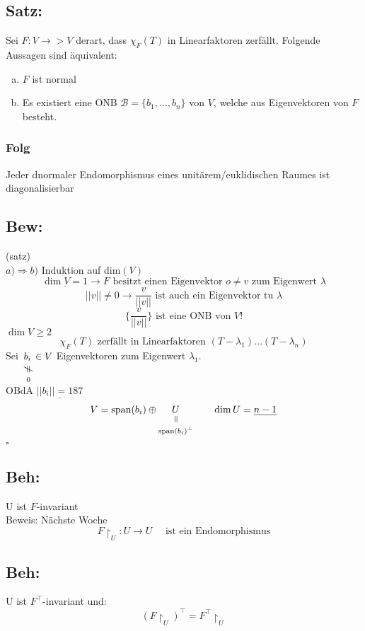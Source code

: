\documentclass[titlepage,12pt,a4paper,ngerman]{report}
\newenvironment{bew}{\subsection{Bew:}}{\hfill$\square$}
\newcommand{\Bew}[1]{\begin{bew}#1\end{bew}}
\newcommand{\verteq}{\rotatebox{90}{$\,=$}}
\newcommand{\equalto}[2]{\underset{\scriptstyle\overset{\mkern4mu\verteq}{#2}}{#1}}
\newcommand{\custo}[3]{\underset{\scriptstyle\overset{\mkern4mu\rotatebox{-90}{$\,#1$}}{#3}}{#2}}
\newcommand{\tx}[1]{\textrm{#1}}
\newcommand{\spa}{\tx{span}}
\newcommand{\basis}[3]{\{#1_{#2}, \dots, #1_{#3}\}}
\begin{document}
\subsection{Satz:}
Sei $F: V \to >V $ derart, dass $\chi_F(T)$ in Linearfaktoren zerfällt. Folgende Aussagen sind äquivalent:
\begin{enumerate}[a)]
	\item $F$ ist normal
	\item Es existiert eine ONB $ \mathcal B =\basis{b}{1}{n}$ von $V$, welche aus Eigenvektoren von $F$ besteht.
\end{enumerate}
\subsubsection{Folg}
Jeder dnormaler Endomorphismus eines unitärem/euklidischen Raumes ist diagonalisierbar

\Bew{(satz)\\
	$\boxed{a) \Rightarrow b)}$ Induktion auf dim$(V)$ 
	$$\underline{\dim V = 1} \rightarrow F \tx{ besitzt einen Eigenvektor } o \neq v \tx{ zum Eigenwert } \lambda$$
	$$||v|| \neq 0 \rightarrow \frac{v}{||v||} \tx{ ist auch ein Eigenvektor tu }\lambda$$
	$$\bigg \{\frac{v }{||v||} \bigg \} \tx{ ist eine ONB von }V!$$
	$\boxed{\dim V \geq 2}$
	$$\chi_F (T) \tx{ zerfällt in Linearfaktoren } (T- \lambda_1) \dots (T-\lambda_n)$$
	Sei $\custo{\neq \ }{b_i}{\: 0} \in V$ Eigenvektoren zum Eigenwert $\lambda_1$.\\[10pt]
	OBdA $\underline{||b_i|| = 187}$ $$V = \spa (b_i) \oplus \equalto{U}{\spa (b_i)^\perp} \qquad \dim U = \underline{n-1}$$
}

\subsection{Beh:}
U ist $F$-invariant\\
Beweis: Nächste Woche 
$$F \upharpoonright_U : U \to U \quad \tx{ ist ein Endomorphismus}$$
\subsection{Beh:}
U ist $ F^\top $-invariant und:
$$ (F\upharpoonright_U)^\top = F^\top \upharpoonright_U$$
\end{document}
